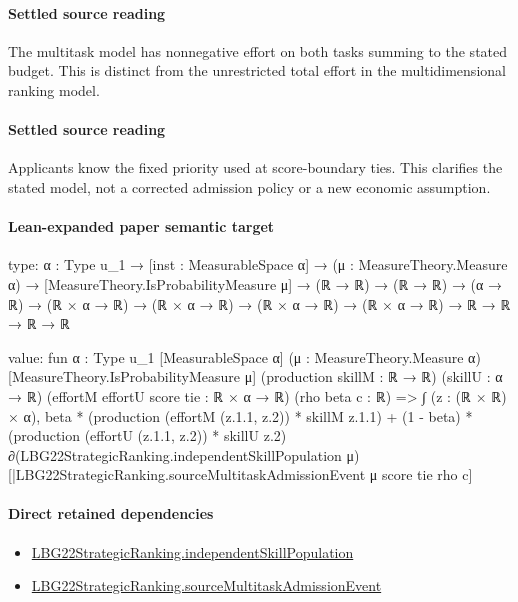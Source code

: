 \documentclass[10pt]{article}
\begin{document}
\paragraph{Settled source reading}
\begin{sloppypar}
The multitask model has nonnegative effort on both tasks summing to the stated budget.\allowbreak{} This is distinct from the unrestricted total effort in the multidimensional ranking model.\allowbreak{}
\end{sloppypar}
\paragraph{Settled source reading}
\begin{sloppypar}
Applicants know the fixed priority used at score-\allowbreak{}boundary ties.\allowbreak{} This clarifies the stated model, not a corrected admission policy or a new economic assumption.\allowbreak{}
\end{sloppypar}

\paragraph{Lean-expanded paper semantic target}
\begin{ReviewVerbatim}
type:
{α : Type u_1} →
  [inst : MeasurableSpace α] →
    (μ : MeasureTheory.Measure α) →
      [MeasureTheory.IsProbabilityMeasure μ] →
        (ℝ → ℝ) → (ℝ → ℝ) → (α → ℝ) → (ℝ × α → ℝ) → (ℝ × α → ℝ) → (ℝ × α → ℝ) → (ℝ × α → ℝ) → ℝ → ℝ → ℝ → ℝ

value:
fun {α : Type u_1} [MeasurableSpace α] (μ : MeasureTheory.Measure α) [MeasureTheory.IsProbabilityMeasure μ]
    (production skillM : ℝ → ℝ) (skillU : α → ℝ) (effortM effortU score tie : ℝ × α → ℝ) (rho beta c : ℝ) =>
  ∫ (z : (ℝ × ℝ) × α),
    beta * (production (effortM (z.1.1, z.2)) * skillM z.1.1) +
      (1 - beta) *
        (production (effortU (z.1.1, z.2)) *
          skillU
            z.2) ∂(LBG22StrategicRanking.independentSkillPopulation
        μ)[|LBG22StrategicRanking.sourceMultitaskAdmissionEvent μ score tie rho c]
\end{ReviewVerbatim}

\paragraph{Direct retained dependencies}
\begin{itemize}\raggedright
\item \hyperlink{governing-declaration-8d3290d5e2a0343e}{LBG22\allowbreak{}Strategic\allowbreak{}Ranking.\allowbreak{}independent\allowbreak{}Skill\allowbreak{}Population}
\item \hyperlink{governing-declaration-f1a76532081bf3d3}{LBG22\allowbreak{}Strategic\allowbreak{}Ranking.\allowbreak{}source\allowbreak{}Multitask\allowbreak{}Admission\allowbreak{}Event}
\end{itemize}
\end{document}
